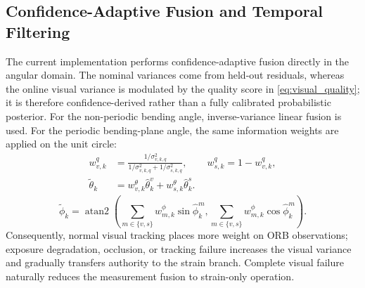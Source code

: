 \documentclass[journal,twoside]{IEEEtran}
\begin{document}
\subsection{Confidence-Adaptive Fusion and Temporal Filtering}
The current implementation performs confidence-adaptive fusion directly in the angular domain. The nominal variances come from held-out residuals, whereas the online visual variance is modulated by the quality score in \eqref{eq:visual_quality}; it is therefore confidence-derived rather than a fully calibrated probabilistic posterior. For the non-periodic bending angle, inverse-variance linear fusion is used. For the periodic bending-plane angle, the same information weights are applied on the unit circle:
\begin{equation}
\begin{aligned}
w_{v,k}^{q}&=\frac{1/\sigma_{v,k,q}^{2}}
{1/\sigma_{v,k,q}^{2}+1/\sigma_{s,k,q}^{2}},
\qquad w_{s,k}^{q}=1-w_{v,k}^{q},\\
\tilde\theta_k&=w_{v,k}^{\theta}\hat\theta_k^v
+w_{s,k}^{\theta}\hat\theta_k^s.
\end{aligned}
\label{eq:fusion_theta}
\end{equation}
\begin{equation}
\tilde\phi_k=\operatorname{atan2}\!\left(
\sum_{m\in\{v,s\}}w_{m,k}^{\phi}\sin\hat\phi_k^m,
\sum_{m\in\{v,s\}}w_{m,k}^{\phi}\cos\hat\phi_k^m
\right).
\label{eq:fusion_phi}
\end{equation}
Consequently, normal visual tracking places more weight on ORB observations; exposure degradation, occlusion, or tracking failure increases the visual variance and gradually transfers authority to the strain branch. Complete visual failure naturally reduces the measurement fusion to strain-only operation.
\end{document}
